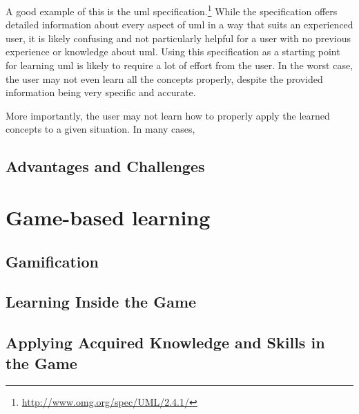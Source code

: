 \noindent
A good example of this is the \gls{uml} specification.\footnote{\url{http://www.omg.org/spec/UML/2.4.1/}} While the specification offers detailed information about every aspect of \gls{uml} in a way that suits an experienced user, it is likely confusing and not particularly helpful for a user with no previous experience or knowledge about \gls{uml}. Using this specification as a starting point for learning \gls{uml} is likely to require a lot of effort from the user. In the worst case, the user may not even learn all the concepts properly, despite the provided information being very specific and accurate.

\noindent
More importantly, the user may not learn how to properly apply the learned concepts to a given situation. In many cases, 


\subsection{Advantages and Challenges}




\section{Game-based learning}
\label{sec:game_based_learning}

\subsection{Gamification}


\subsection{Learning Inside the Game}


\subsection{Applying Acquired Knowledge and Skills in the Game}






